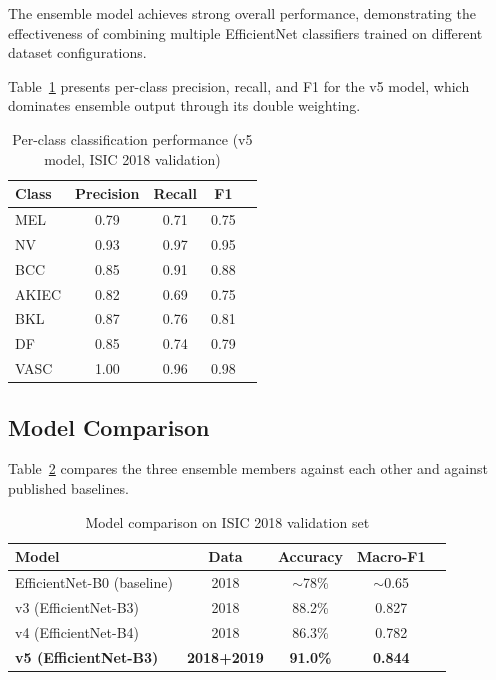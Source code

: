 \documentclass[conference]{IEEEtran}
\begin{document}
The ensemble model achieves strong overall performance, demonstrating the effectiveness of combining multiple EfficientNet classifiers trained on different dataset configurations.

Table~\ref{tab:perclass} presents per-class precision, recall, and F1 for the v5 model, which dominates ensemble output through its double weighting.

\begin{table}[htbp]
\centering
\caption{Per-class classification performance (v5 model, ISIC 2018 validation)}
\label{tab:perclass}
\begin{tabular}{lcccc}
\toprule
Class & Precision & Recall & F1  \\
\midrule
MEL  & 0.79 & 0.71 & 0.75  \\
NV   & 0.93 & 0.97 & 0.95  \\
BCC  & 0.85 & 0.91 & 0.88  \\
AKIEC& 0.82 & 0.69 & 0.75  \\
BKL  & 0.87 & 0.76 & 0.81  \\
DF   & 0.85 & 0.74 & 0.79  \\
VASC & 1.00 & 0.96 & 0.98 \\
\bottomrule
\end{tabular}
\end{table}



\subsection{Model Comparison}

Table~\ref{tab:model_comparison} compares the three ensemble members against each other and against published baselines.

\begin{table}[htbp]
\centering
\caption{Model comparison on ISIC 2018 validation set}
\label{tab:model_comparison}
\begin{tabular}{lcccc}
\toprule
Model & Data & Accuracy & Macro-F1  \\
\midrule
EfficientNet-B0 (baseline) & 2018 & $\sim$78\% & $\sim$0.65  \\
v3 (EfficientNet-B3) & 2018 & 88.2\% & 0.827 \\
v4 (EfficientNet-B4) & 2018 & 86.3\% & 0.782  \\
\textbf{v5 (EfficientNet-B3)} & \textbf{2018+2019} & \textbf{91.0\%} & \textbf{0.844} &  \\
\bottomrule
\end{tabular}
\end{table}
\end{document}
